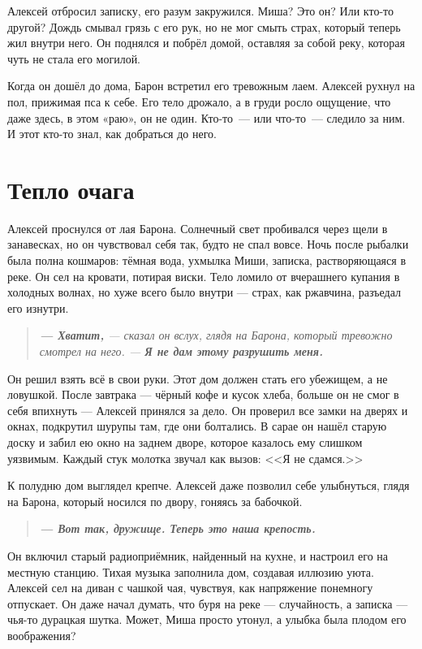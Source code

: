 \documentclass[12pt,a4paper]{book}
\newenvironment{dialogue}{\begin{quote}\itshape}{\end{quote}} %
\begin{document}
Алексей отбросил записку, его разум закружился. Миша? Это он? Или кто-то другой? Дождь смывал грязь с его рук, но не мог смыть страх, который теперь жил внутри него. Он поднялся и побрёл домой, оставляя за собой реку, которая чуть не стала его могилой.

Когда он дошёл до дома, Барон встретил его тревожным лаем. Алексей рухнул на пол, прижимая пса к себе. Его тело дрожало, а в груди росло ощущение, что даже здесь, в этом «раю», он не один. Кто-то~--- или что-то~--- следило за ним. И этот кто-то знал, как добраться до него.

\chapter{Тепло очага}

Алексей проснулся от лая Барона. Солнечный свет пробивался через щели в занавесках, но он чувствовал себя так, будто не спал вовсе. Ночь после рыбалки была полна кошмаров: тёмная вода, ухмылка Миши, записка, растворяющаяся в реке. Он сел на кровати, потирая виски. Тело ломило от вчерашнего купания в холодных волнах, но хуже всего было внутри --- страх, как ржавчина, разъедал его изнутри.

\begin{dialogue}
\textbf{--- Хватит,} --- сказал он вслух, глядя на Барона, который тревожно смотрел на него. --- \textbf{Я не дам этому разрушить меня.}
\end{dialogue}

Он решил взять всё в свои руки. Этот дом должен стать его убежищем, а не ловушкой. После завтрака --- чёрный кофе и кусок хлеба, больше он не смог в себя впихнуть --- Алексей принялся за дело. Он проверил все замки на дверях и окнах, подкрутил шурупы там, где они болтались. В сарае он нашёл старую доску и забил ею окно на заднем дворе, которое казалось ему слишком уязвимым. Каждый стук молотка звучал как вызов: <<Я не сдамся.>>

К полудню дом выглядел крепче. Алексей даже позволил себе улыбнуться, глядя на Барона, который носился по двору, гоняясь за бабочкой.

\begin{dialogue}
\textbf{--- Вот так, дружище. Теперь это наша крепость.}
\end{dialogue}

Он включил старый радиоприёмник, найденный на кухне, и настроил его на местную станцию. Тихая музыка заполнила дом, создавая иллюзию уюта. Алексей сел на диван с чашкой чая, чувствуя, как напряжение понемногу отпускает. Он даже начал думать, что буря на реке --- случайность, а записка --- чья-то дурацкая шутка. Может, Миша просто утонул, а улыбка была плодом его воображения?
\end{document}
